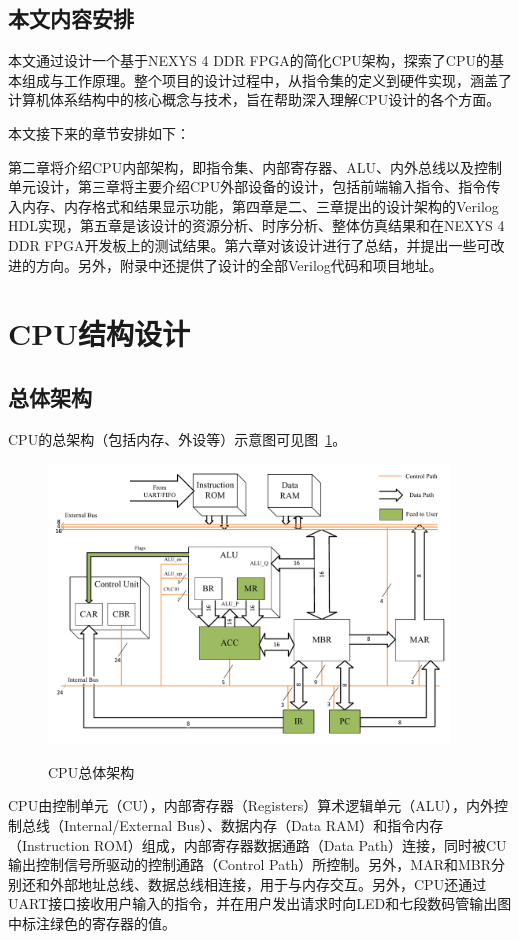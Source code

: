 \documentclass[lang=cn,a4paper,newtx]{elegantpaper}
\begin{document}
\subsection{本文内容安排}
本文通过设计一个基于NEXYS 4 DDR FPGA的简化CPU架构，探索了CPU的基本组成与工作原理。整个项目的设计过程中，从指令集的定义到硬件实现，涵盖了计算机体系结构中的核心概念与技术，旨在帮助深入理解CPU设计的各个方面。


本文接下来的章节安排如下：

第二章将介绍CPU内部架构，即指令集、内部寄存器、ALU、内外总线以及控制单元设计，第三章将主要介绍CPU外部设备的设计，包括前端输入指令、指令传入内存、内存格式和结果显示功能，第四章是二、三章提出的设计架构的Verilog HDL实现，第五章是该设计的资源分析、时序分析、整体仿真结果和在NEXYS 4 DDR FPGA开发板上的测试结果。第六章对该设计进行了总结，并提出一些可改进的方向。另外，附录中还提供了设计的全部Verilog代码和项目地址。

\section{CPU结构设计}
\subsection{总体架构}

CPU的总架构（包括内存、外设等）示意图可见图~\ref{fig:CPU}。
\begin{figure}[htbp]
  \centering
  \caption{CPU总体架构}
  \includegraphics[width = 0.95\textwidth]{figure/CPU_structure.pdf}
  \label{fig:CPU}
\end{figure}

CPU由控制单元（CU），内部寄存器（Registers）算术逻辑单元（ALU），内外控制总线（Internal/External Bus）、数据内存（Data RAM）和指令内存（Instruction ROM）组成，内部寄存器数据通路（Data Path）连接，同时被CU输出控制信号所驱动的控制通路（Control Path）所控制。另外，MAR和MBR分别还和外部地址总线、数据总线相连接，用于与内存交互。另外，CPU还通过UART接口接收用户输入的指令，并在用户发出请求时向LED和七段数码管输出图中标注绿色的寄存器的值。
\end{document}
